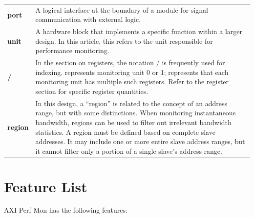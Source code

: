 \documentclass[main\_\_EN.tex]{subfiles}
\begin{document}
\begin{longtable}[c]{ R{3.1 cm} p{13.5 cm} }
    \textbf{port} & A logical interface at the boundary of a module for signal communication with external logic.\\
    \textbf{unit} & A hardware block that implements a specific function within a larger design. In this article, this refers to the unit responsible for performance monitoring.\\
    \textbf{/} & In the section on registers, the notation / is frequently used for indexing.  represents monitoring unit 0 or 1;  represents that each monitoring unit has multiple such registers. Refer to the register section for specific register quantities.\\
    \textbf{region} & In this design, a “region” is related to the concept of an address range, but with some distinctions. When monitoring instantaneous bandwidth, regions can be used to filter out irrelevant bandwidth statistics. A region must be defined based on complete slave addresses. It may include one or more entire slave address ranges, but it cannot filter only a portion of a single slave's address range.
\end{longtable}


\section{Feature List}

AXI Perf Mon has the following features:
\end{document}

